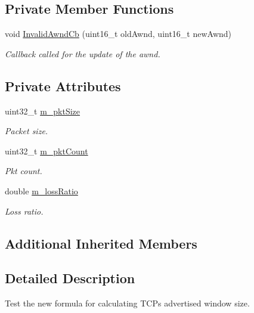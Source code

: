 \subsection*{Private Member Functions}
\begin{DoxyCompactItemize}
\item 
void \hyperlink{classTcpAdvertisedWindowTest_ab1d7ff6c4da3cdeaa25ae3c109f4b3c5}{Invalid\+Awnd\+Cb} (uint16\+\_\+t old\+Awnd, uint16\+\_\+t new\+Awnd)
\begin{DoxyCompactList}\small\item\em Callback called for the update of the awnd. \end{DoxyCompactList}\end{DoxyCompactItemize}
\subsection*{Private Attributes}
\begin{DoxyCompactItemize}
\item 
uint32\+\_\+t \hyperlink{classTcpAdvertisedWindowTest_a15543ae7eb5ff02ef55df25327f489d4}{m\+\_\+pkt\+Size}
\begin{DoxyCompactList}\small\item\em Packet size. \end{DoxyCompactList}\item 
uint32\+\_\+t \hyperlink{classTcpAdvertisedWindowTest_ab2bb9b1d37975c7a054af56d40f5d033}{m\+\_\+pkt\+Count}
\begin{DoxyCompactList}\small\item\em Pkt count. \end{DoxyCompactList}\item 
double \hyperlink{classTcpAdvertisedWindowTest_a8c9c999fd976892f003de76c56e7fff1}{m\+\_\+loss\+Ratio}
\begin{DoxyCompactList}\small\item\em Loss ratio. \end{DoxyCompactList}\end{DoxyCompactItemize}
\subsection*{Additional Inherited Members}


\subsection{Detailed Description}
Test the new formula for calculating T\+CP\textquotesingle{}s advertised window size. 

